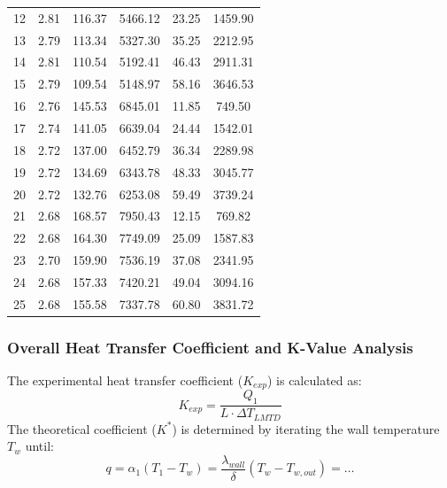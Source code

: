 {\begin{longtable}{|c|c|c|c|c|c|}
    12           & 2.81            & 116.37          & 5466.12                         & 23.25 & 1459.90 \\
    13           & 2.79            & 113.34          & 5327.30                         & 35.25 & 2212.95 \\
    14           & 2.81            & 110.54          & 5192.41                         & 46.43 & 2911.31 \\
    15           & 2.79            & 109.54          & 5148.97                         & 58.16 & 3646.53 \\ \hline
    16           & 2.76            & 145.53          & 6845.01                         & 11.85 & 749.50  \\
    17           & 2.74            & 141.05          & 6639.04                         & 24.44 & 1542.01 \\
    18           & 2.72            & 137.00          & 6452.79                         & 36.34 & 2289.98 \\
    19           & 2.72            & 134.69          & 6343.78                         & 48.33 & 3045.77 \\
    20           & 2.72            & 132.76          & 6253.08                         & 59.49 & 3739.24 \\ \hline
    21           & 2.68            & 168.57          & 7950.43                         & 12.15 & 769.82  \\
    22           & 2.68            & 164.30          & 7749.09                         & 25.09 & 1587.83 \\
    23           & 2.70            & 159.90          & 7536.19                         & 37.08 & 2341.95 \\
    24           & 2.68            & 157.33          & 7420.21                         & 49.04 & 3094.16 \\
    25           & 2.68            & 155.58          & 7337.78                         & 60.80 & 3831.72 \\ \hline
\end{longtable}
}

\subsubsection{Overall Heat Transfer Coefficient and K-Value Analysis}\label{k-value-analysis}

The experimental heat transfer coefficient ($K_{exp}$) is calculated as:
\begin{equation}
    K_{exp} = \frac{Q_1}{L \cdot \Delta T_{LMTD}}
\end{equation}
The theoretical coefficient ($K^*$) is determined by iterating the wall temperature $T_w$ until:
\begin{equation}
    q = \alpha_1 (T_1 - T_w) = \frac{\lambda_{wall}}{\delta} (T_w - T_{w,out}) = \dots
\end{equation}

